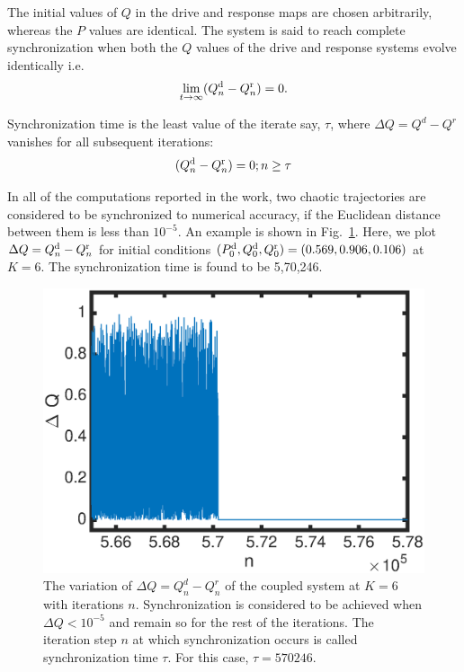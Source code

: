 \documentclass[reprint,amsmath,amssymb,aps,pre]{revtex4-1}
\begin{document}
The initial values of $Q$ in the drive and response maps are chosen 
arbitrarily, whereas the $P$ values are identical. The system is said to reach 
complete synchronization when both the $Q$ values of the drive and response 
systems evolve identically i.e. 
\begin{equation}
\lim_{t\rightarrow\infty}(Q^\textnormal{d}_n - Q^\textnormal{r}_n) = 0.
\end{equation}

Synchronization time is the least value of the iterate say, $\tau$, where $\Delta Q = Q^d-Q^r$ vanishes for all subsequent iterations: 
\begin{equation}
(Q^\textnormal{d}_n - Q^\textnormal{r}_n) = 0; \hfill  n \geq  \bf {\tau }
\end{equation}

In all of the computations reported in the work, two chaotic trajectories are considered to be synchronized to numerical accuracy, if the Euclidean distance between them is less than $10^{-5}$. An example is shown in 
Fig.~\ref{fig:sync_ex}. Here, we plot $\Delta Q = Q^\textnormal{d}_n-Q^\textnormal{r}_n$ for initial 
conditions $(P^\textnormal{d}_0,Q^\textnormal{d}_0,Q^\textnormal{r}_0) = 
(0.569, 0.906,0.106)$ at $K = 6$. The synchronization time is found to be 5,70,246. 

\begin{figure}[b]
	\includegraphics[scale=.4]{Sync_exmaple}
	\caption{\label{fig:sync_ex} \footnotesize The variation of $\Delta Q = Q^d_n-Q^r_n$ of the coupled system at $K = 6$ with iterations $n$. Synchronization is considered to be achieved when $\Delta Q < 10^{-5}$ and remain so for the rest of the iterations. The iteration step $n$ at which synchronization occurs is called synchronization time $\tau$. For this case, $\tau = 570 246.$ }
\end{figure}
\end{document}
